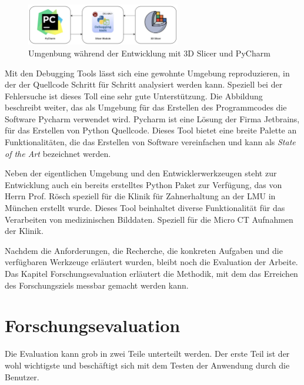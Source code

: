 \begin{figure}[h]
	\centering
	\includegraphics[width=0.6\textwidth]{img/Entwicklungsumgebung.png}
	\caption{Umgenbung während der Entwicklung mit 3D Slicer und PyCharm}
	\label{fig:entwicklungsumgebung}
\end{figure}

Mit den Debugging Tools lässt sich eine gewohnte Umgebung reproduzieren, in der der
Quellcode Schritt für Schritt analysiert werden kann. Speziell bei der
Fehlersuche ist dieses Toll eine sehr gute Unterstützung. Die Abbildung beschreibt
weiter, das als Umgebung für das Erstellen des Programmcodes die Software
Pycharm verwendet wird. Pycharm ist eine Lösung der Firma Jetbrains, für das
Erstellen von Python Quellcode. Dieses Tool bietet eine breite Palette an Funktionalitäten,
die das Erstellen von Software vereinfachen und kann als \textit{State of the
Art} bezeichnet werden.

Neben der eigentlichen Umgebung und den Entwicklerwerkzeugen steht zur Entwicklung
auch ein bereits erstelltes Python Paket zur Verfügung, das von Herrn Prof. Rösch
speziell für die Klinik für Zahnerhaltung an der LMU in München erstellt wurde.
Dieses Tool beinhaltet diverse Funktionalität für das Verarbeiten von
medizinischen Bilddaten. Speziell für die Micro CT Aufnahmen der Klinik.

Nachdem die Anforderungen, die Recherche, die konkreten Aufgaben und die verfügbaren
Werkzeuge erläutert wurden, bleibt noch die Evaluation der Arbeite. Das Kapitel Forschungsevaluation
erläutert die Methodik, mit dem das Erreichen des Forschungsziels messbar
gemacht werden kann.


\section{Forschungsevaluation}
Die Evaluation kann grob in zwei Teile unterteilt werden. Der erste Teil ist der
wohl wichtigste und beschäftigt sich mit dem Testen der Anwendung durch die
Benutzer.
